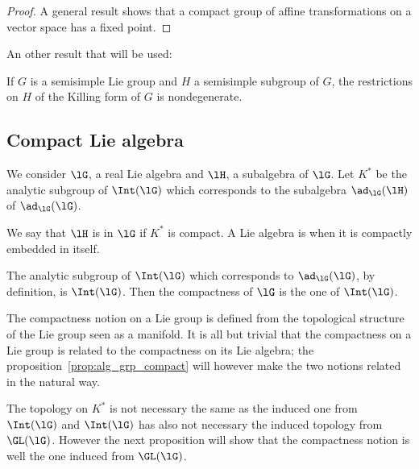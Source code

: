 \begin{proof}
A general result shows that a compact group of affine transformations on a vector space has a fixed point.

\end{proof}

An other result that will be used:
\begin{lemma}		\label{lem:Killing_ss_descent}
If $G$ is a semisimple Lie group and $H$ a semisimple subgroup of $G$, the restrictions on $H$ of the Killing form of $G$ is nondegenerate.
\end{lemma}

\subsection{Compact Lie algebra}\label{pg:compact_Lie}

We consider $\lG$, a real Lie algebra and $\lH$, a subalgebra of $\lG$. Let $K^*$ be the analytic subgroup of $\Int(\lG)$ which corresponds to the subalgebra $\ad_{\lG}(\lH)$ of $\ad_{\lG}(\lG)$.

\begin{definition}
We say that $\lH$ is  in $\lG$ if $K^*$ is compact. A Lie algebra is  when it is compactly embedded in itself.
\end{definition}

The analytic subgroup of $\Int(\lG)$ which corresponds to $\ad_{\lG}(\lG)$, by definition, is $\Int(\lG)$. Then the compactness of $\lG$ is the one of $\Int(\lG)$.

\begin{remark}
The compactness notion on a Lie group is defined from the topological structure of the Lie group seen as a manifold. It is all but trivial that the compactness on a Lie group is related to the compactness on its Lie algebra; the proposition~\ref{prop:alg_grp_compact} will however make the two notions related in the natural way.
\end{remark}

\begin{remark}
The topology on $K^*$ is not necessary the same as the induced one from $\Int(\lG)$ and $\Int(\lG)$ has also not necessary the induced topology from $\GL(\lG)$. However the next proposition will show that the compactness notion is well the one induced from $\GL(\lG)$.
\end{remark}

